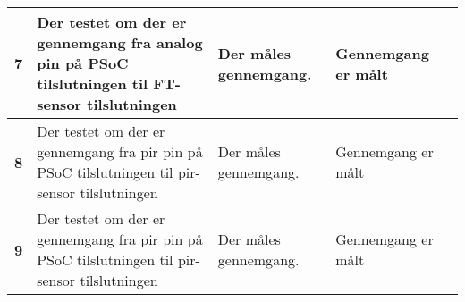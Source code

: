\begin{center}
\begin{longtable}{|p{}|p{}|p{}|p{}|p{}|}
\textbf{7}	&Der testet om der er gennemgang fra analog pin på PSoC tilslutningen til FT-sensor tilslutningen
			&Der måles gennemgang.
			& Gennemgang er målt
			& \\ \hline 
			
\textbf{8}	&Der testet om der er gennemgang fra pir pin på PSoC tilslutningen til pir-sensor tilslutningen
			&Der måles gennemgang.
			& Gennemgang er målt
			& \\ \hline 
			
\textbf{9}	&Der testet om der er gennemgang fra pir pin på PSoC tilslutningen til pir-sensor tilslutningen
			&Der måles gennemgang.
			& Gennemgang er målt
			& \\ \hline 
			
		
			
			
\end{longtable}
	\label{modultest_tilslutningsprint} 
\end{center}